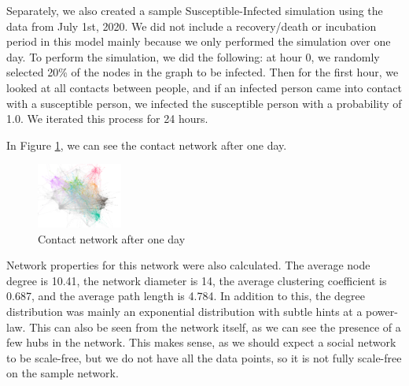 \documentclass[times, 10pt,twocolumn]{article}
\begin{document}

Separately, we also created a sample Susceptible-Infected simulation using the data from July 1st, 2020. We did not include a recovery/death or incubation period in this model mainly because we only performed the simulation over one day. To perform the simulation, we did the following: at hour 0, we randomly selected 20\% of the nodes in the graph to be infected. Then for the first hour, we looked at all contacts between people, and if an infected person came into contact with a susceptible person, we infected the susceptible person with a probability of 1.0. We iterated this process for 24 hours.




In Figure \ref{fig:my_label}, we can see the contact network after one day.
\begin{figure}
    \centering
    \includegraphics[width=0.25\textwidth]{imgs/one_day_net.png}
    \caption{Contact network after one day}
    \label{fig:my_label}
\end{figure}
Network properties for this network were also calculated. The average node degree is 10.41, the network diameter is 14, the average clustering coefficient is 0.687, and the average path length is 4.784. In addition to this, the degree distribution was mainly an exponential distribution with subtle hints at a power-law. This can also be seen from the network itself, as we can see the presence of a few hubs in the network. This makes sense, as we should expect a social network to be scale-free, but we do not have all the data points, so it is not fully scale-free on the sample network.
\end{document}
